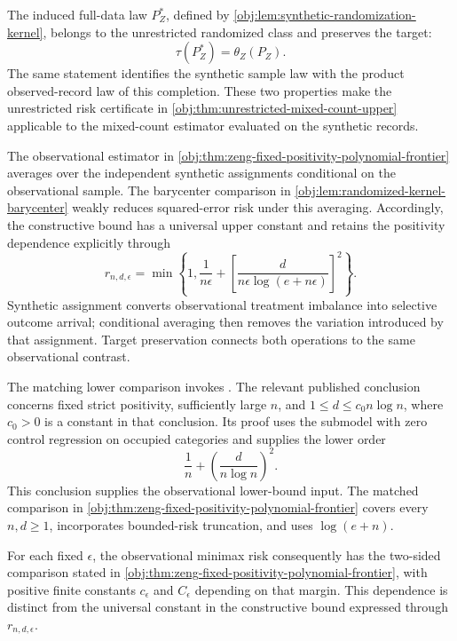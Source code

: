 The induced full-data law \(P_Z^*\), defined by \cref{obj:lem:synthetic-randomization-kernel}, belongs to the unrestricted randomized class and preserves the target:
\[
\tau(P_Z^*)=\theta_Z(P_Z).
\]
The same statement identifies the synthetic sample law with the product observed-record law of this completion. These two properties make the unrestricted risk certificate in \cref{obj:thm:unrestricted-mixed-count-upper} applicable to the mixed-count estimator evaluated on the synthetic records.

The observational estimator  in \cref{obj:thm:zeng-fixed-positivity-polynomial-frontier} averages over the independent synthetic assignments conditional on the observational sample. The barycenter comparison in \cref{obj:lem:randomized-kernel-barycenter} weakly reduces squared-error risk under this averaging. Accordingly, the constructive bound has a universal upper constant and retains the positivity dependence explicitly through
\[
r_{n,d,\epsilon}
=
\min\left\{
1,\frac{1}{n\epsilon}
+
\left[
\frac{d}{n\epsilon\log(e+n\epsilon)}
\right]^2
\right\}.
\]
Synthetic assignment converts observational treatment imbalance into selective outcome arrival; conditional averaging then removes the variation introduced by that assignment. Target preservation connects both operations to the same observational contrast.

The matching lower comparison invokes \citet[Theorem~2, Section~3.2, p.~9, together with its proof in Section~C.5, pp.~39--44]{ZengBalakrishnanHanKennedy2026}. The relevant published conclusion concerns fixed strict positivity, sufficiently large \(n\), and \(1\le d\le c_0n\log n\), where \(c_0>0\) is a constant in that conclusion. Its proof uses the submodel with zero control regression on occupied categories and supplies the lower order
\[
\frac1n+\left(\frac{d}{n\log n}\right)^2.
\]
This conclusion supplies the observational lower-bound input. The matched comparison in \cref{obj:thm:zeng-fixed-positivity-polynomial-frontier} covers every \(n,d\ge1\), incorporates bounded-risk truncation, and uses \(\log(e+n)\).

For each fixed \(\epsilon\), the observational minimax risk  consequently has the two-sided comparison stated in \cref{obj:thm:zeng-fixed-positivity-polynomial-frontier}, with positive finite constants \(c_\epsilon\) and \(C_\epsilon\) depending on that margin. This dependence is distinct from the universal constant in the constructive bound expressed through \(r_{n,d,\epsilon}\).

